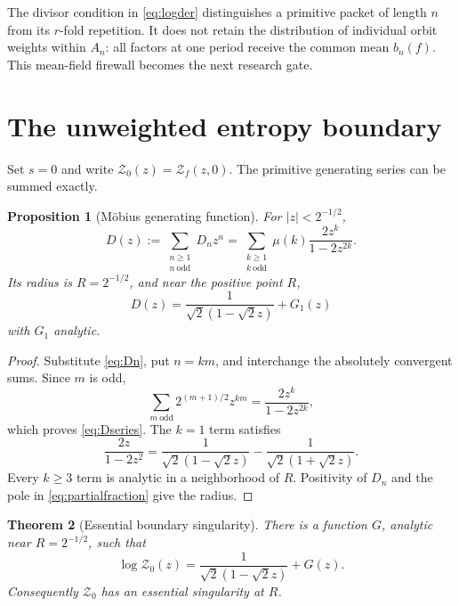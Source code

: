 \documentclass[11pt]{article}
\newtheorem{theorem}{Theorem}[section]
\newtheorem{proposition}[theorem]{Proposition}
\newcommand{\Zpack}{\mathcal Z}
\begin{document}
The divisor condition in \eqref{eq:logder} distinguishes a primitive packet
of length $n$ from its $r$-fold repetition.  It does not retain the
distribution of individual orbit weights within $A_n$: all factors at one
period receive the common mean $b_n(f)$.  This mean-field firewall becomes
the next research gate.

\section{The unweighted entropy boundary}

Set $s=0$ and write $\Zpack_0(z)=\Zpack_f(z,0)$.  The primitive generating
series can be summed exactly.

\begin{proposition}[M\"obius generating function]\label{prop:Dseries}
For $|z|<2^{-1/2}$,
\begin{equation}\label{eq:Dseries}
 D(z):=\sum_{\substack{n\ge1\\n\ \mathrm{odd}}}D_nz^n
 =\sum_{\substack{k\ge1\\k\ \mathrm{odd}}}
 \mu(k)\frac{2z^k}{1-2z^{2k}}.
\end{equation}
Its radius is $R=2^{-1/2}$, and near the positive point $R$,
\begin{equation}\label{eq:Dprincipal}
 D(z)=\frac{1}{\sqrt2(1-\sqrt2z)}+G_1(z)
\end{equation}
with $G_1$ analytic.
\end{proposition}

\begin{proof}
Substitute \eqref{eq:Dn}, put $n=km$, and interchange the absolutely
convergent sums.  Since $m$ is odd,
\[
 \sum_{m\ \mathrm{odd}}2^{(m+1)/2}z^{km}
 =\frac{2z^k}{1-2z^{2k}},
\]
which proves \eqref{eq:Dseries}.  The $k=1$ term satisfies
\begin{equation}\label{eq:partialfraction}
 \frac{2z}{1-2z^2}
 =\frac{1}{\sqrt2(1-\sqrt2z)}
  -\frac{1}{\sqrt2(1+\sqrt2z)}.
\end{equation}
Every $k\ge3$ term is analytic in a neighborhood of $R$.  Positivity of
$D_n$ and the pole in \eqref{eq:partialfraction} give the radius.
\end{proof}

\begin{theorem}[Essential boundary singularity]\label{thm:essential}
There is a function $G$, analytic near $R=2^{-1/2}$, such that
\begin{equation}\label{eq:logprincipal}
 \log\Zpack_0(z)=\frac{1}{\sqrt2(1-\sqrt2z)}+G(z).
\end{equation}
Consequently $\Zpack_0$ has an essential singularity at $R$.
\end{theorem}
\end{document}
